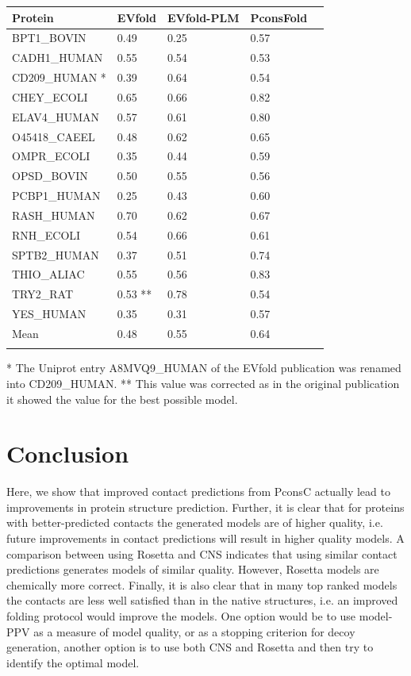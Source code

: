 \documentclass{bioinfo}
\begin{document}
\begin{table}[!t]
{\begin{tabular}{lp{1.5cm}p{1.5cm}p{1.5cm}p{1.5cm}}\toprule
Protein & EVfold  & EVfold-PLM  & PconsFold\\\midrule
BPT1\_BOVIN & 0.49 & 0.25  & 0.57 \\
CADH1\_HUMAN & 0.55 & 0.54  & 0.53 \\
CD209\_HUMAN * & 0.39 & 0.64  & 0.54 \\
CHEY\_ECOLI & 0.65 & 0.66  & 0.82 \\
ELAV4\_HUMAN & 0.57 & 0.61  & 0.80 \\
O45418\_CAEEL & 0.48 & 0.62  & 0.65 \\
OMPR\_ECOLI & 0.35 & 0.44  & 0.59 \\
OPSD\_BOVIN & 0.50 & 0.55  & 0.56 \\
PCBP1\_HUMAN & 0.25 & 0.43  & 0.60 \\
RASH\_HUMAN & 0.70 & 0.62  & 0.67 \\
RNH\_ECOLI & 0.54 & 0.66  & 0.61 \\
SPTB2\_HUMAN & 0.37 & 0.51 & 0.74 \\
THIO\_ALIAC & 0.55 & 0.56  & 0.83 \\
TRY2\_RAT & 0.53 ** & 0.78  & 0.54 \\
YES\_HUMAN & 0.35 & 0.31  & 0.57 \\ \midrule
Mean & 0.48 & 0.55  & 0.64 \\ \botrule
\end{tabular}}{* The Uniprot entry A8MVQ9\_HUMAN of the EVfold publication was renamed into CD209\_HUMAN. ** This value was corrected as in the original publication it showed the value for the best possible model.}
\end{table}


\section{Conclusion}

Here, we show that improved contact predictions from
PconsC \cite[]{skwark_PconsC:_2013} actually lead to improvements in
protein structure prediction. Further, it is clear that for proteins
with better-predicted contacts the generated models are of higher
quality, i.e. future improvements in contact predictions will result
in higher quality models. A comparison between using Rosetta and
CNS indicates that using similar contact predictions generates
models of similar quality. However, Rosetta models are chemically
more correct. Finally, it is also clear that in many top ranked models
the contacts are less well satisfied than in the native structures,
i.e. an improved folding protocol would improve the models. One
option would be to use model-PPV as a measure of model quality, or as
a stopping criterion for decoy generation, another option is to use
both CNS and Rosetta and then try to identify the optimal model.
\end{document}
